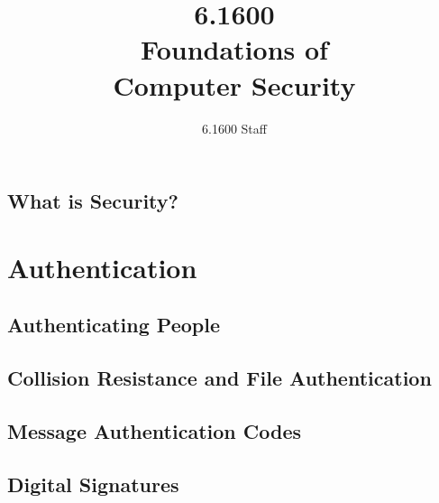 \documentclass[
letterpaper, %
oneside
]{tufte-book}
\author{6.1600 Staff}
\title{6.1600\\Foundations of\\Computer Security}
\begin{document}
\mainmatter

\maketitle

\clearpage

\tableofcontents*
\clearpage


\chapter{What is Security?}



\part{Authentication}
\chapter{Authenticating People}



\chapter{Collision Resistance and File Authentication}



\chapter{Message Authentication Codes}



\chapter{Digital Signatures}




\backmatter

%

\end{document}

